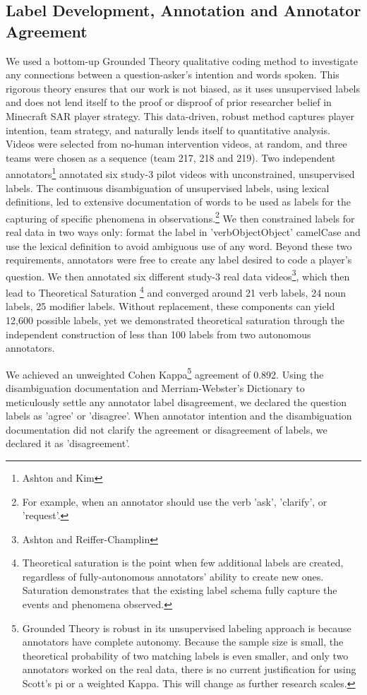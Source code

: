 \subsection{Label Development, Annotation and Annotator Agreement}
We used a bottom-up Grounded Theory qualitative coding method to investigate any connections between a question-asker's intention and words spoken. This rigorous theory ensures that our work is not biased, as it uses unsupervised labels and does not lend itself to the proof or disproof of prior researcher belief in Minecraft SAR player strategy. This data-driven, robust method captures player intention, team strategy, and naturally lends itself to quantitative analysis. Videos were selected from no-human intervention videos, at random, and three teams were chosen as a sequence (team 217, 218 and 219). Two independent annotators\footnote{Ashton and Kim} annotated six study-3 pilot videos with unconstrained, unsupervised labels. The continuous disambiguation of unsupervised labels, using lexical definitions, led to extensive documentation of words to be used as labels for the capturing of specific phenomena in observations.\footnote{For example, when an annotator should use the verb 'ask', 'clarify', or 'request'.} We then constrained labels for real data in two ways only: format the label in 'verbObjectObject' camelCase and use the lexical definition to avoid ambiguous use of any word. Beyond these two requirements, annotators were free to create any label desired to code a player's question. We then annotated six different study-3 real data videos\footnote{Ashton and Reiffer-Champlin}, which then lead to Theoretical Saturation \footnote{Theoretical saturation is the point when few additional labels are created, regardless of fully-autonomous annotators' ability to create new ones. Saturation demonstrates that the existing label schema fully capture the events and phenomena observed.} and converged around 21 verb labels, 24 noun labels, 25 modifier labels. Without replacement, these components can yield 12,600 possible labels, yet we demonstrated theoretical saturation through the independent construction of less than 100 labels from two autonomous annotators.

We achieved an unweighted Cohen Kappa\footnote{Grounded Theory is robust in its unsupervised labeling approach is because annotators have complete autonomy. Because the sample size is small, the theoretical probability of two matching labels is even smaller, and only two annotators worked on the real data, there is no current justification for using Scott's pi or a weighted Kappa. This will change as further research scales.} agreement of 0.892. Using the disambiguation documentation and Merriam-Webster's Dictionary to meticulously settle any annotator label disagreement, we declared the question labels as 'agree' or 'disagree'. When annotator intention and the disambiguation documentation did not clarify the agreement or disagreement of labels, we declared it as 'disagreement'. 


